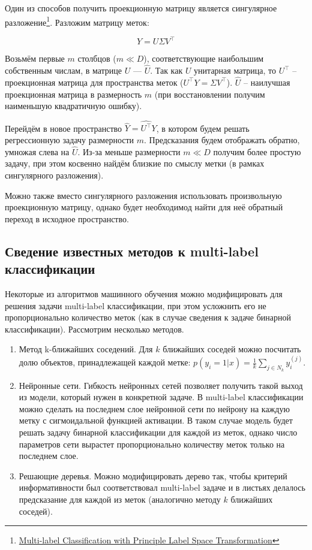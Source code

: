 \documentclass[12pt,fleqn]{article}
\begin{document}
Один из способов получить проекционную матрицу является сингулярное разложение\footnote{\href{http://ntur.lib.ntu.edu.tw/retrieve/188514/18.pdf}{Multi-label Classification with Principle Label Space Transformation}}. Разложим матрицу меток:

$$
Y = U \Sigma V^\top
$$

Возьмём первые $m$ столбцов ($m \ll D$), соответствующие наибольшим собственным числам, в матрице $U$ --- $\hat{U}$. Так как $U$ унитарная матрица, то $U^\top$ -- проекционная матрица для пространства меток ($U^\top Y = \Sigma V^\top$). $\hat{U}$ -- наилучшая проекционная матрица в размерность $m$ (при восстановлении получим наименьшую квадратичную ошибку).

Перейдём в новое пространство $\hat{Y} = \hat{U^\top} Y$, в котором будем решать регрессионную задачу размерности $m$. Предсказания будем отображать обратно, умножая слева на $\hat{U}$. Из-за меньше размерности $m \ll D$ получим более простую задачу, при этом косвенно найдём близкие по смыслу метки (в рамках сингулярного разложения).

Можно также вместо сингулярного разложения использовать произвольную проекционную матрицу, однако будет необходимод найти для неё обратный переход в исходное пространство.


\subsection{Сведение известных методов к multi-label классификации}

Некоторые из алгоритмов машинного обучения можно модифицировать для решения задачи multi-label классификации, при этом усложнить его не пропорционально количество меток (как в случае сведения к задаче бинарной классификации). Рассмотрим несколько методов.

\begin{enumerate}
	\item Метод k-ближайших соседений. Для $k$ ближайших соседей можно посчитать долю объектов, принадлежащей каждой метке: $p(y_i = 1 | x) = \frac{1}{k} \sum_{j \in {N_k}} y_i^{(j)}$.

	\item Нейронные сети. Гибкость нейронных сетей позволяет получить такой выход из модели, который нужен в конкретной задаче. В multi-label классификации можно сделать на последнем слое нейронной сети по нейрону на каждую метку с сигмоидальной функцией активации. В таком случае модель будет решать задачу бинарной классификации для каждой из меток, однако число параметров сети вырастет пропорционально количеству меток только на последнем слое.

    \item Решающие деревья. Можно модифицировать дерево так, чтобы критерий информативности был соответствовал multi-label задаче и в листьях делалось предсказание для каждой из меток (аналогично методу $k$ ближайших соседей).
\end{enumerate}
\end{document}
